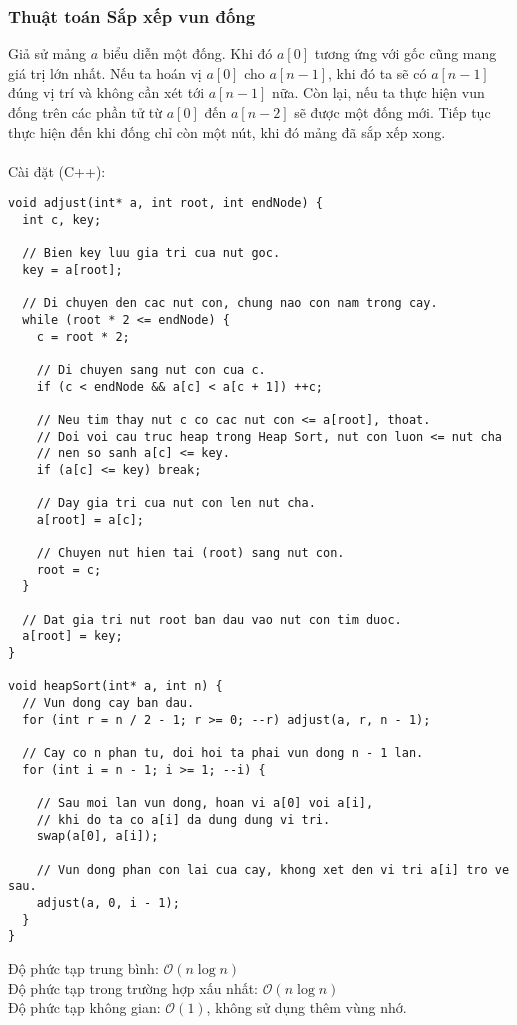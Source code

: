 \documentclass[]{article}
\begin{document}
\subsubsection{Thuật toán Sắp xếp vun đống}
Giả sử mảng $a$ biểu diễn một đống. Khi đó $a[0]$ tương ứng với gốc cũng mang giá trị lớn nhất. Nếu ta hoán vị $a[0]$ cho $a[n - 1]$, khi đó ta sẽ có $a[n - 1]$ đúng vị trí và không cần xét tới $a[n - 1]$ nữa. Còn lại, nếu ta thực hiện vun đống trên các phần tử từ $a[0]$ đến $a[n - 2]$ sẽ được một đống mới. Tiếp tục thực hiện đến khi đống chỉ còn một nút, khi đó mảng đã sắp xếp xong.
\\\\
Cài đặt (C++):
\begin{lstlisting}
void adjust(int* a, int root, int endNode) {
  int c, key;

  // Bien key luu gia tri cua nut goc.
  key = a[root];

  // Di chuyen den cac nut con, chung nao con nam trong cay.
  while (root * 2 <= endNode) {
    c = root * 2;

    // Di chuyen sang nut con cua c.
    if (c < endNode && a[c] < a[c + 1]) ++c;

    // Neu tim thay nut c co cac nut con <= a[root], thoat.
    // Doi voi cau truc heap trong Heap Sort, nut con luon <= nut cha
    // nen so sanh a[c] <= key.
    if (a[c] <= key) break;

    // Day gia tri cua nut con len nut cha.
    a[root] = a[c];

    // Chuyen nut hien tai (root) sang nut con.
    root = c;
  }

  // Dat gia tri nut root ban dau vao nut con tim duoc.
  a[root] = key;
}

void heapSort(int* a, int n) {
  // Vun dong cay ban dau.
  for (int r = n / 2 - 1; r >= 0; --r) adjust(a, r, n - 1);

  // Cay co n phan tu, doi hoi ta phai vun dong n - 1 lan.
  for (int i = n - 1; i >= 1; --i) {

    // Sau moi lan vun dong, hoan vi a[0] voi a[i],
    // khi do ta co a[i] da dung dung vi tri.
    swap(a[0], a[i]);

    // Vun dong phan con lai cua cay, khong xet den vi tri a[i] tro ve sau.
    adjust(a, 0, i - 1);
  }
}
\end{lstlisting}
Độ phức tạp trung bình: $\mathcal{O}(n \log n)$
\\
Độ phức tạp trong trường hợp xấu nhất: $\mathcal{O}(n \log n)$
\\
Độ phức tạp không gian: $\mathcal{O}(1)$, không sử dụng thêm vùng nhớ.
\end{document}
